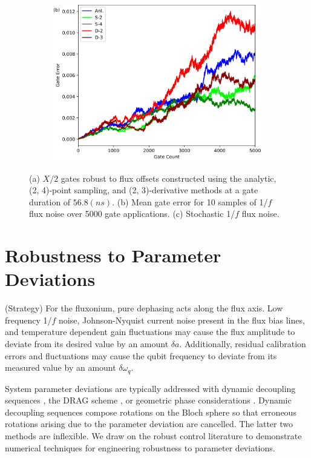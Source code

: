 \documentclass[
  amsfonts,
  amsmath,
  tbtags,
  amssymb,
  aps,
  nobibnotes,
  twocolumn,
]{revtex4-2}
\begin{document}
\begin{figure}[ht]
  \begin{subfigure}{\linewidth}
    \includegraphics[width=\linewidth]{assets/f3b.png}
  \end{subfigure}
  
  \caption{\centering (a) $X/2$ gates robust to flux offsets constructed using the analytic,
    (2, 4)-point sampling, and (2, 3)-derivative methods at a gate duration
    of $56.8 (ns)$. (b) Mean gate error for 10 samples of 1/$f$ flux noise over 5000
    gate applications. (c) Stochastic 1/$f$ flux noise.}
\end{figure}

\section{Robustness to Parameter Deviations}
(Strategy) For the fluxonium, pure dephasing acts
along the flux axis. Low frequency 1/$f$ noise,
Johnson-Nyquist current noise present in the flux bias
lines, and temperature dependent gain fluctuations
may cause the flux amplitude to deviate from its
desired value by an amount $\delta a$. Additionally,
residual calibration errors and fluctuations may cause
the qubit frequency to deviate from its measured value
by an amount $\delta \omega_{q}$.

System parameter
deviations are typically addressed with dynamic decoupling
sequences \cite{merrill2014progress},
the DRAG scheme \cite{krantz2019quantum}, or
geometric phase considerations
\cite{xu2020nonadiabatic} \cite{han2020experimental}.
Dynamic decoupling sequences compose rotations on the
Bloch sphere so that erroneous rotations arising due
to the parameter deviation are cancelled.
The latter two methods are inflexible. We draw on the
robust control literature to demonstrate
numerical techniques for engineering robustness
to parameter deviations.
\end{document}
